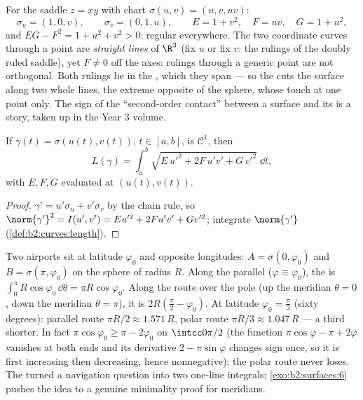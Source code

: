 \begin{example}\label{ex:b2:surfaces:saddlechart}
For the saddle $z = xy$ with chart $\sigma(u, v) = (u, v,
uv)$:
\[
\sigma_u = (1, 0, v), \qquad \sigma_v = (0, 1, u),
\qquad
E = 1 + v^2, \quad F = uv, \quad G = 1 + u^2 ,
\]
and $EG - F^2 = 1 + u^2 + v^2 > 0$: regular everywhere. The
two coordinate curves through a point are \emph{straight
lines} of $\R^3$ (fix $u$ or fix $v$: the rulings of the
doubly ruled saddle), yet $F \neq 0$ off the axes: rulings
through a generic point are not orthogonal. Both rulings lie
in the , which they span --- so the  cuts the surface along two whole lines, the extreme
opposite of the sphere, whose  touch at one
point only. The sign of the ``second-order contact'' between
a surface and its  is a  story,
taken up in the Year 3 volume.
\end{example}

\begin{proposition}\label{prop:b2:surfaces:curvelength}
If $\gamma(t) = \sigma(u(t), v(t))$, $t \in [a, b]$, is
$\mathcal{C}^1$, then
\[
L(\gamma) = \int_a^b
\sqrt{E\,u'^2 + 2F\,u'v' + G\,v'^2}\;\dd t ,
\]
with $E, F, G$ evaluated at $(u(t), v(t))$.
\end{proposition}

\begin{proof}
$\gamma' = u'\sigma_u + v'\sigma_v$ by the chain rule, so
$\norm{\gamma'}^2 = I(u', v') = Eu'^2 + 2Fu'v' + Gv'^2$; integrate
$\norm{\gamma'}$ (\cref{def:b2:curves:length}).
\end{proof}

\begin{example}\label{ex:b2:surfaces:polarroute}
Two airports sit at latitude $\varphi_0$ and opposite
longitudes: $A = \sigma(0, \varphi_0)$ and $B = \sigma(\pi,
\varphi_0)$ on the sphere of radius $R$. Along the parallel
($\varphi \equiv \varphi_0$), the  is
$\int_0^\pi R\cos\varphi_0\,\dd\theta = \pi R\cos\varphi_0$.
Along the route over the pole (up the meridian $\theta = 0$,
down the meridian $\theta = \pi$), it is $2R(\frac\pi2 -
\varphi_0)$. At latitude $\varphi_0 = \frac\pi3$ (sixty
degrees): parallel route $\pi R/2 \approx 1.571\,R$, polar
route $\pi R/3 \approx 1.047\,R$ --- a third shorter. In fact
$\pi\cos\varphi_0 \geq \pi - 2\varphi_0$ on
$\intcc0{\pi/2}$ (the function $\pi\cos\varphi - \pi +
2\varphi$ vanishes at both ends and its derivative $2 -
\pi\sin\varphi$ changes sign once, so it is first increasing
then decreasing, hence nonnegative): the polar route never
loses. The  turned a navigation question
into two one-line integrals; \cref{exo:b2:surfaces:6} pushes
the idea to a genuine minimality proof for meridians.
\end{example}

